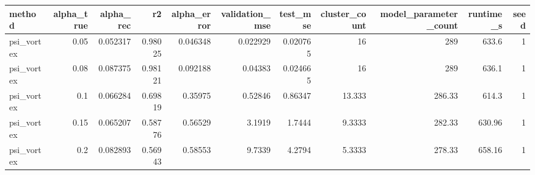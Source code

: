 \begin{tabular}{lrrrrrrrrrr}
\toprule
method & alpha\_true & alpha\_rec & r2 & alpha\_error & validation\_mse & test\_mse & cluster\_count & model\_parameter\_count & runtime\_s & seed \\
\midrule
psi\_vortex & 0.05 & 0.052317 & 0.98025 & 0.046348 & 0.022929 & 0.020765 & 16 & 289 & 633.6 & 1 \\
psi\_vortex & 0.08 & 0.087375 & 0.98121 & 0.092188 & 0.04383 & 0.024665 & 16 & 289 & 636.1 & 1 \\
psi\_vortex & 0.1 & 0.066284 & 0.69819 & 0.35975 & 0.52846 & 0.86347 & 13.333 & 286.33 & 614.3 & 1 \\
psi\_vortex & 0.15 & 0.065207 & 0.58776 & 0.56529 & 3.1919 & 1.7444 & 9.3333 & 282.33 & 630.96 & 1 \\
psi\_vortex & 0.2 & 0.082893 & 0.56943 & 0.58553 & 9.7339 & 4.2794 & 5.3333 & 278.33 & 658.16 & 1 \\
\bottomrule
\end{tabular}
